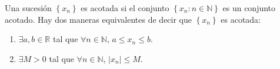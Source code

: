 \begin{frame}
  \begin{definition}
    Una sucesión $\left\{x_{n}\right\}$ es \alert{acotada} si el
    conjunto $\left\{x_{n}:n\in\mathbb{N}\right\}$ es un conjunto
    acotado.
    Hay dos maneras equivalentes de decir que $\left\{x_{n}\right\}$
    es \alert{acotada}:
    \begin{multicols}{2}
      \begin{enumerate}[(1)]
        \item

              $\exists a,b\in\mathbb{R}$ tal que
              $\forall n\in\mathbb{N}$, $a\leq x_{n}\leq b$.

        \item

              $\exists M>0$ tal que $\forall n\in\mathbb{N}$,
              $\left|x_{n}\right|\leq M$.
      \end{enumerate}
    \end{multicols}
  \end{definition}
\end{frame}

